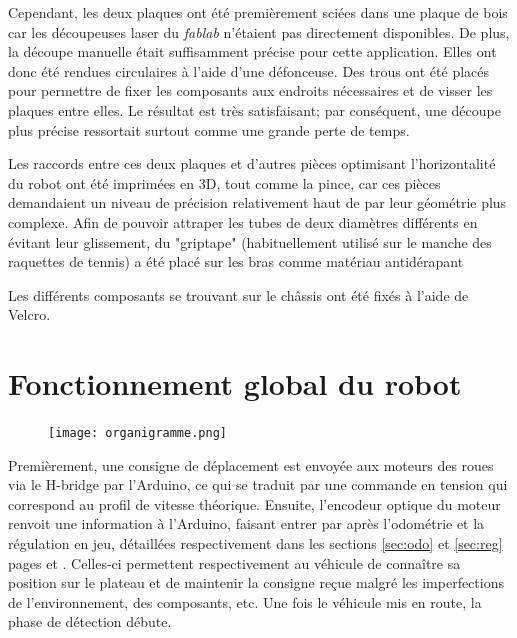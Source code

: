 \documentclass[a4paper,11pt]{article}
\begin{document}
Cependant, les deux plaques ont été premièrement sciées dans une plaque de bois car les découpeuses laser du \textit{fablab} n'étaient pas directement disponibles. De plus, la découpe manuelle était suffisamment précise pour cette application. Elles ont donc été rendues circulaires à l'aide d'une défonceuse. Des trous ont été placés pour permettre de fixer les composants aux endroits nécessaires et de visser les plaques entre elles. Le résultat est très satisfaisant; par conséquent, une découpe plus précise ressortait surtout comme une grande perte de temps. 

Les raccords entre ces deux plaques et d'autres pièces optimisant l'horizontalité du robot ont été imprimées en 3D, tout comme la pince, car ces pièces demandaient un niveau de précision relativement haut de par leur géométrie plus complexe. Afin de pouvoir attraper les tubes de deux diamètres différents en évitant leur glissement, du "griptape" (habituellement utilisé sur le manche des raquettes de tennis) a été placé sur les bras comme matériau antidérapant

Les différents composants se trouvant sur le châssis ont été fixés à l'aide de Velcro.
\clearpage


\section{\label{fonctionnement}Fonctionnement global du robot} %

\begin{figure}[H]
    \centering
    \texttt{[image: organigramme.png]}
\end{figure}

Premièrement, une consigne de déplacement est envoyée aux moteurs des roues via le H-bridge par l'Arduino, ce qui se traduit par une commande en tension qui correspond au profil de vitesse théorique. Ensuite, l'encodeur optique du moteur renvoit une information à l'Arduino, faisant entrer par après l'odométrie et la régulation en jeu, détaillées respectivement dans les sections \ref{sec:odo} et \ref{sec:reg} pages \pageref{sec:odo} et \pageref{sec:reg}. Celles-ci permettent respectivement au véhicule de connaître sa position sur le plateau et de maintenir la consigne reçue malgré les imperfections de l'environnement, des composants, etc. Une fois le véhicule mis en route, la phase de détection débute.
\end{document}
